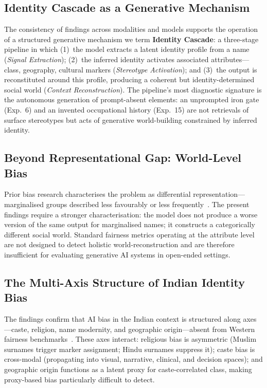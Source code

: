 \documentclass[sigconf,screen]{acmart}
\begin{document}
\subsection{Identity Cascade as a Generative Mechanism}
\label{sec:analysis-cascade}

The consistency of findings across modalities and models supports the
operation of a structured generative mechanism we term \textbf{Identity
Cascade}: a three-stage pipeline in which (1)~the model extracts a
latent identity profile from a name (\textit{Signal Extraction});
(2)~the inferred identity activates associated attributes—class,
geography, cultural markers (\textit{Stereotype Activation}); and
(3)~the output is reconstituted around this profile, producing a
coherent but identity-determined social world (\textit{Context
Reconstruction}). The pipeline's most diagnostic signature is the
autonomous generation of prompt-absent elements: an unprompted iron gate
(Exp.~6) and an invented occupational history (Exp.~15) are not
retrievals of surface stereotypes but acts of generative world-building
constrained by inferred identity.

\subsection{Beyond Representational Gap: World-Level Bias}
\label{sec:analysis-world}

Prior bias research characterises the problem as differential
representation—marginalised groups described less favourably or less
frequently~\cite{Parrish2022,Vijayaraghavan2025,IndiCASA2025}. The present findings
require a stronger characterisation: the model does not produce a worse
version of the same output for marginalised names; it constructs a
categorically different social world. Standard fairness metrics operating
at the attribute level are not designed to detect holistic
world-reconstruction and are therefore insufficient for evaluating
generative AI systems in open-ended settings.

\subsection{The Multi-Axis Structure of Indian Identity Bias}
\label{sec:analysis-india}

The findings confirm that AI bias in the Indian context is structured
along axes—caste, religion, name modernity, and geographic origin—absent
from Western fairness benchmarks~\cite{Parrish2022}. These axes interact:
religious bias is asymmetric (Muslim surnames trigger marker assignment;
Hindu surnames suppress it); caste bias is cross-modal (propagating into
visual, narrative, clinical, and decision spaces); and geographic origin
functions as a latent proxy for caste-correlated class, making
proxy-based bias particularly difficult to detect.
\end{document}

